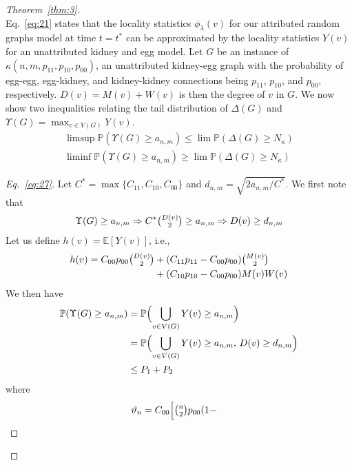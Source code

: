 \documentclass[draftcls]{IEEEtran}
\theoremstyle{definition}
\begin{document}
\begin{proof}[Theorem~\ref{thm:3}]
\begin{equation}
\end{equation}
Eq.~\eqref{eq:21} states that the locality statistics
$\phi_\lambda(v)$ for our
attributed random graphs model at time $t = t^{*}$ can be approximated by
the locality statistics $Y(v)$ for an unattributed kidney and egg
model. Let $G$ be an instance of $\kappa(n,m,p_{11},
p_{10}, p_{00})$, an unattributed kidney-egg graph with the
probability of egg-egg, egg-kidney, and kidney-kidney connections
being $p_{11}$, $p_{10}$, and $p_{00}$, respectively. $D(v) = M(v) + W(v)$ is then the degree
of $v$ in $G$. We now show two
inequalities relating the tail distribution of 
$\Delta(G)$ and $\Upsilon(G) = \max_{v \in V(G)} Y(v)$.
\begin{gather}
  \label{eq:27}
    \limsup \mathbb{P}( \Upsilon(G) \geq a_{n,m} ) \leq \lim
   \mathbb{P}( \Delta(G) \geq N_\kappa) \\
   \label{eq:30}
  \liminf \mathbb{P}( \Upsilon(G) \geq a_{n,m} ) \geq \lim \mathbb{P}(
  \Delta(G) \geq N_{\kappa})
\end{gather}
\begin{proof}[Eq.~\eqref{eq:27}]
 Let $C^{*} = \max\{C_{11},
C_{10}, C_{00}\}$ and $d_{n,m} = \sqrt{2 a_{n,m}/C^{*}}$. We first
note that
\begin{equation*}
\Upsilon(G) \geq a_{n,m} \Rightarrow C^{*} \tbinom{D(v)}{2} \geq
a_{n,m} \Rightarrow D(v) \geq d_{n,m} 
\end{equation*}
Let us define $h(v) = \mathbb{E}[Y(v)]$, i.e., 
\begin{equation*}
  \begin{split}
  h(v) = C_{00}p_{00} \tbinom{D(v)}{2} &+ (C_{11} p_{11} - C_{00}
  p_{00}) \tbinom{M(v)}{2} \\ &+ (C_{10} p_{10} - C_{00} p_{00}) M(v) W(v)
  \end{split}
\end{equation*}
We then have
  \begin{equation*}
    \label{eq:31}
    \begin{split}
    \mathbb{P}(\Upsilon(G) \geq a_{n,m}) &= \mathbb{P}\Bigl( \bigcup_{v
      \in V(G)} Y(v) \geq a_{n,m}\Bigr) \\
    &= \mathbb{P}\Bigl( \bigcup_{v
      \in V(G)} Y(v) \geq a_{n,m}, \, D(v) \geq d_{n,m} \Bigr) \\
    &\leq P_1 + P_2
    \end{split}
  \end{equation*}
  where 
  \begin{align*}
    \vartheta_n &= C_{00} \Bigl[ \tbinom{n}{2} p_{00} (1 -

\end{align*}
\end{proof}
\end{proof}
\end{document}
